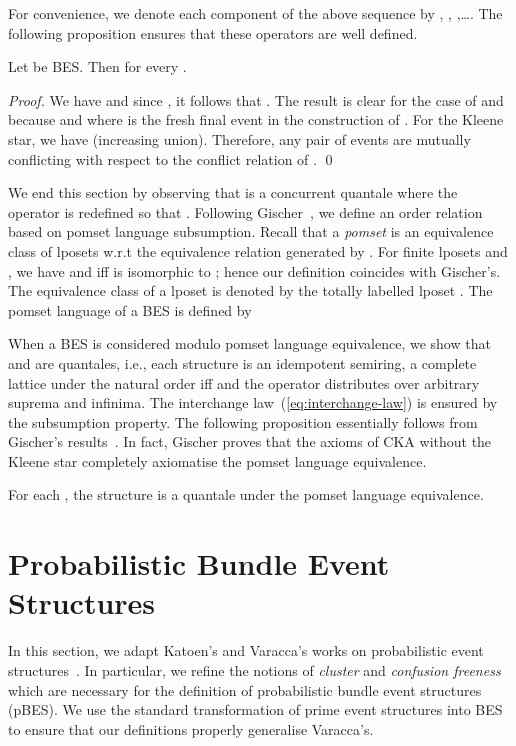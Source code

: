 \documentclass{llncs}
\newcommand{\<}{\langle}
\renewcommand{\>}{\rangle}
\begin{document}
For convenience, we denote each component of the above sequence by , , ,\dots. The following proposition ensures that these operators are well defined.

\begin{proposition}\label{pro:well-defined}
Let  be BES. Then for every   .
\end{proposition}

\begin{proof}
We have  and since , it follows that . The result is clear for the case of  and  because  and  where  is the fresh final event in the construction of . For the Kleene star, we have  (increasing union). Therefore, any pair of events   are mutually conflicting with respect to the conflict relation of . 
\qed
\end{proof}

We end this section by observing that  is a concurrent quantale where the operator  is redefined so that . Following Gischer~\cite{Gis88}, we define an order relation based on pomset language subsumption. Recall that a \emph{pomset} is an equivalence class of lposets w.r.t the equivalence relation generated by . For finite lposets  and , we have  and  iff  is isomorphic to ; hence our definition coincides with Gischer's. The equivalence class of a lposet  is denoted by the totally labelled lposet . The pomset language of a BES  is defined  by 
 
When a BES is considered modulo pomset language equivalence, we show that  and  are quantales, 
i.e., each structure is an idempotent
semiring, a complete lattice
under the natural order  iff  and 
the operator  distributes over arbitrary suprema and infinima. The interchange law~(\ref{eq:interchange-law}) is ensured by the subsumption property. The following proposition essentially follows from Gischer's results~\cite{Gis88}. In fact, Gischer proves that the axioms of CKA without the Kleene star completely axiomatise the pomset language equivalence.

\begin{proposition}\label{pro:cka}
For each , the structure  is a quantale under the pomset language equivalence.
\end{proposition}


\section{Probabilistic Bundle Event Structures}\label{pBES}

In this section, we adapt Katoen's and Varacca's works on probabilistic event structures~\cite{Kat96,Var03}. In particular, we refine the notions of \emph{cluster} and \emph{confusion freeness} which are necessary for the definition of probabilistic bundle event structures (pBES). We use the standard transformation of prime event structures into BES to ensure that our definitions properly generalise Varacca's.
\end{document}
